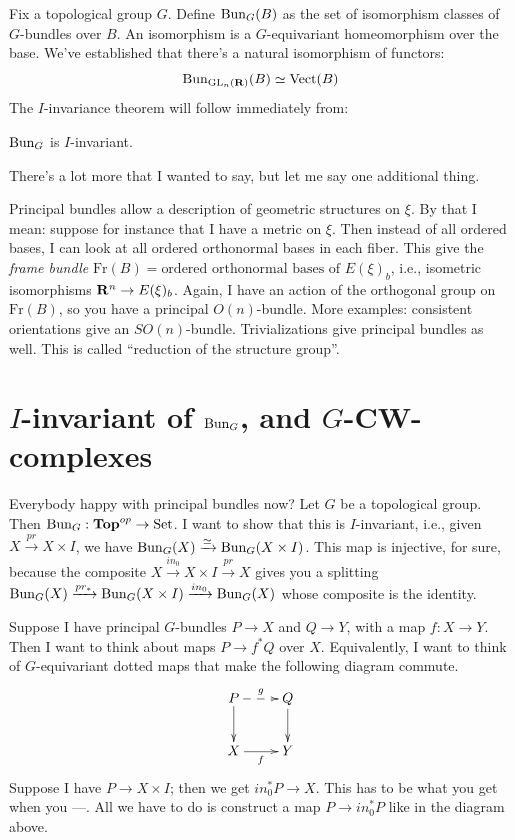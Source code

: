 Fix a topological group $G$. Define $\mathrm{Bun}_G(B)$ as the set of isomorphism classes of $G$-bundles over $B$. An isomorphism is a $G$-equivariant homeomorphism over the base.
We've established that there's a natural isomorphism of functors:
$$\mathrm{Bun}_{\mathrm{GL}_n(\mathbf R)}(B) \simeq \operatorname{Vect}(B)$$
The $I$-invariance theorem will follow immediately from:
\begin{theorem}
    $\mathrm{Bun}_G$ is $I$-invariant.
\end{theorem}
There's a lot more that I wanted to say, but let me say one additional thing.

Principal bundles allow a description of geometric structures on $\xi$. By that I mean: suppose for instance that I have a metric on $\xi$. Then instead of all ordered bases, I can look at all ordered orthonormal bases in each fiber. This give the \emph{frame bundle} $\mathrm{Fr}(B) = \text{ordered orthonormal bases of }E(\xi)_b$, i.e., isometric isomorphisms $\mathbf R^n\to E(\xi)_b$. Again, I have an action of the orthogonal group on $\mathrm{Fr}(B)$, so you have a principal $O(n)$-bundle. More examples: consistent orientations give an $SO(n)$-bundle. Trivializations give principal bundles as well. This is called ``reduction of the structure group''.
\section{$I$-invariant of $\mathrm{Bun}_G$, and $G$-CW-complexes}
Everybody happy with principal bundles now?
Let $G$ be a topological group. Then $\mathrm{Bun}_G:\mathbf{Top}^{op}\to\mathrm{Set}$.
I want to show that this is $I$-invariant, i.e., given $X\xrightarrow{pr}X\times I$, we have $\mathrm{Bun}_G(X)\xrightarrow{\simeq}\mathrm{Bun}_G(X\times I)$.
This map is injective, for sure, because the composite $X\xrightarrow{in_0} X\times I\xrightarrow{pr}X$ gives you a splitting $\mathrm{Bun}_G(X)\xrightarrow{pr_\ast}\mathrm{Bun}_G(X\times I)\xrightarrow{in_0}\mathrm{Bun}_G(X)$ whose composite is the identity.

Suppose I have principal $G$-bundles $P\to X$ and $Q\to Y$, with a map $f:X\to Y$. Then I want to think about maps $P\to f^\ast Q$ over $X$. Equivalently, I want to think of $G$-equivariant dotted maps that make the following diagram commute.
\begin{equation*}
    \xymatrix{
	P\ar@{-->}[r]^g\ar[d] & Q\ar[d]\\
	X\ar[r]_f & Y
    }
\end{equation*}
Suppose I have $P\to X\times I$; then we get $in_0^\ast P\to X$. This has to be what you get when you ---. All we have to do is construct a map $P\to in_0^\ast P$ like in the diagram above.

